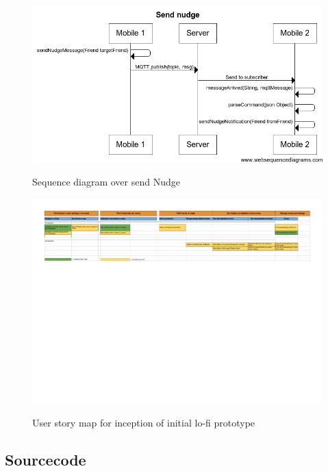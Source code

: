 \documentclass[runningheads,a4paper]{llncs}
\begin{document}
\begin{figure}
\centering
\caption{Sequence diagram over send Nudge}
\includegraphics[scale=0.5]{figures/sq-2}
\label{fig:sq-nudge}
\end{figure}

\begin{landscape}
\begin{figure}
\caption{User story map for inception of initial lo-fi prototype}
\includegraphics{figures/user_story_mapping}
\label{fig:user_story_mapping}
\end{figure}
\restoregeometry
\end{landscape}
\restoregeometry


\subsection*{Sourcecode} \label{source-code}
\lstset{numbers=left,
tabsize=1, numbersep=10pt,
  title=\lstname }


\restoregeometry
\end{document}
